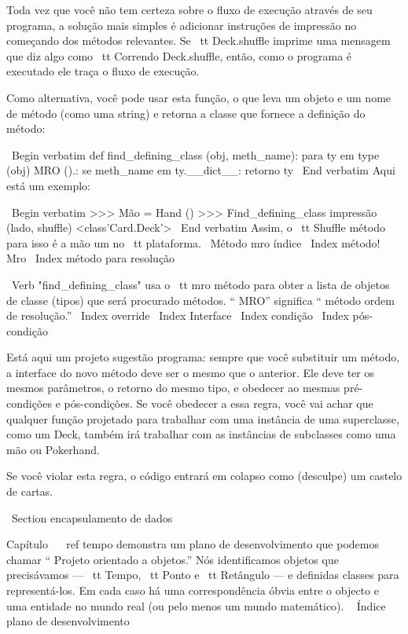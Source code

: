 \documentclass[10pt]{book}
\begin{document}
{{{{{{{{{{{{{{{{{Toda vez que você não tem certeza sobre o fluxo de execução através de seu
programa, a solução mais simples é adicionar instruções de impressão no
começando dos métodos relevantes. Se {\ tt Deck.shuffle} imprime uma
mensagem que diz algo como {\ tt Correndo Deck.shuffle}, então, como
o programa é executado ele traça o fluxo de execução.

Como alternativa, você pode usar esta função, o que leva um
objeto e um nome de método (como uma string) e retorna a classe que
fornece a definição do método:

\ Begin {verbatim}
def find_defining_class (obj, meth_name):
    para ty em type (obj) MRO ().:
        se meth_name em ty.__dict__:
            retorno ty
\ End {verbatim}
%
Aqui está um exemplo:

\ Begin {verbatim}
>>> Mão = Hand ()
>>> Find_defining_class impressão (lado, shuffle)
<class'Card.Deck'>
\ End {verbatim}
%
Assim, o {\ tt Shuffle} método para isso é a mão um no {\ tt plataforma}.
\ {Método mro} índice
\ Index {método! Mro}
\ Index {método para resolução}

\ Verb "find_defining_class" usa o {\ tt mro} método para obter a lista
de objetos de classe (tipos) que será procurado métodos. `` MRO''
significa `` método ordem de resolução.''
\ Index {override}
\ Index {Interface}
\ Index {condição}
\ Index {pós-condição}

Está aqui um projeto sugestão programa: sempre que você substituir um método,
a interface do novo método deve ser o mesmo que o anterior. Ele
deve ter os mesmos parâmetros, o retorno do mesmo tipo, e obedecer ao
mesmas pré-condições e pós-condições. Se você obedecer a essa regra, você
vai achar que qualquer função projetado para trabalhar com uma instância de uma
superclasse, como um Deck, também irá trabalhar com as instâncias de subclasses
como uma mão ou Pokerhand.

Se você violar esta regra, o código entrará em colapso como (desculpe)
um castelo de cartas.


\ Section {encapsulamento de dados}

Capítulo ~ \ ref {tempo} demonstra um plano de desenvolvimento que podemos chamar
`` Projeto orientado a objetos.'' Nós identificamos objetos que precisávamos --- {\ tt
  Tempo}, {\ tt Ponto} e {\ tt Retângulo} --- e definidas classes para
representá-los. Em cada caso há uma correspondência óbvia
entre o objecto e uma entidade no mundo real (ou pelo menos um
mundo matemático).
\ {} Índice plano de desenvolvimento

}}}}}}}}}}}}}}}}}
\end{document}
